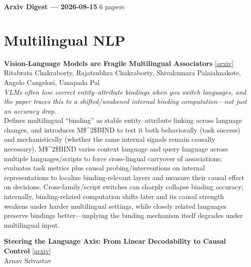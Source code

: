 \documentclass[12pt,letterpaper]{article}
\begin{document}
{\footnotesize\textbf{Arxiv Digest --- 2026-08-15} \hfill 6 papers}

\smallskip

\section*{Multilingual NLP}

{\small\textbf{Vision-Language Models are Fragile Multilingual Associators}} {\scriptsize[\href{https://arxiv.org/abs/2608.12333}{arxiv}]}\\
{\scriptsize Ritabrata Chakraborty, Rajatsubhra Chakraborty, Shivakumara Palaiahnakote, Angelo Cangelosi, Umapada Pal}\\

{\small\textit{VLMs often lose correct entity--attribute bindings when you switch languages, and the paper traces this to a shifted/weakened internal binding computation---not just an accuracy drop.}}\\[1pt]
{\footnotesize Defines multilingual ``binding'' as stable entity--attribute linking across language changes, and introduces M\$\textasciicircum{}2\$BIND to test it both behaviorally (task success) and mechanistically (whether the same internal signals remain causally necessary). M\$\textasciicircum{}2\$BIND varies context language and query language across multiple languages/scripts to force cross-lingual carryover of associations; evaluates task metrics plus causal probing/interventions on internal representations to localize binding-relevant layers and measure their causal effect on decisions. Cross-family/script switches can sharply collapse binding accuracy; internally, binding-related computation shifts later and its causal strength weakens under harder multilingual settings, while closely related languages preserve bindings better---implying the binding mechanism itself degrades under multilingual input.}

\medskip

{\small\textbf{Steering the Language Axis: From Linear Decodability to Causal Control}} {\scriptsize[\href{https://arxiv.org/abs/2608.12334}{arxiv}]}\\
{\scriptsize Arnav Srivastav}\\
\end{document}
